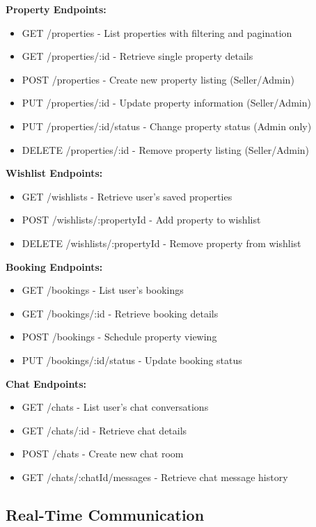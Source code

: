 \textbf{Property Endpoints:}
\begin{itemize}
    \item GET /properties - List properties with filtering and pagination
    \item GET /properties/:id - Retrieve single property details
    \item POST /properties - Create new property listing (Seller/Admin)
    \item PUT /properties/:id - Update property information (Seller/Admin)
    \item PUT /properties/:id/status - Change property status (Admin only)
    \item DELETE /properties/:id - Remove property listing (Seller/Admin)
\end{itemize}

\textbf{Wishlist Endpoints:}
\begin{itemize}
    \item GET /wishlists - Retrieve user's saved properties
    \item POST /wishlists/:propertyId - Add property to wishlist
    \item DELETE /wishlists/:propertyId - Remove property from wishlist
\end{itemize}

\textbf{Booking Endpoints:}
\begin{itemize}
    \item GET /bookings - List user's bookings
    \item GET /bookings/:id - Retrieve booking details
    \item POST /bookings - Schedule property viewing
    \item PUT /bookings/:id/status - Update booking status
\end{itemize}

\textbf{Chat Endpoints:}
\begin{itemize}
    \item GET /chats - List user's chat conversations
    \item GET /chats/:id - Retrieve chat details
    \item POST /chats - Create new chat room
    \item GET /chats/:chatId/messages - Retrieve chat message history
\end{itemize}

\subsection{Real-Time Communication}


